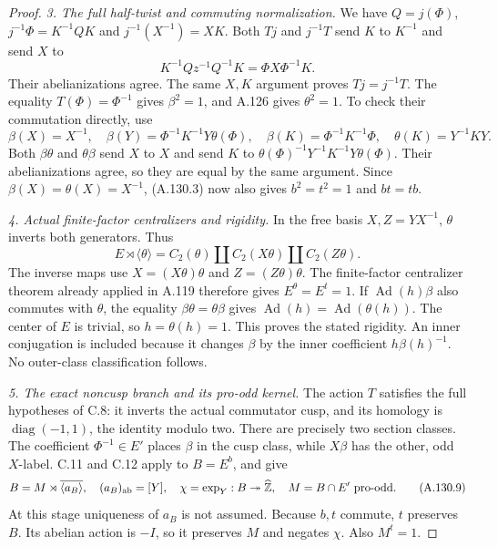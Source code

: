 \begin{proof}
\emph{3. The full half-twist and commuting normalization.}
We have \(Q=j(\Phi)\), \(j^{-1}\Phi=K^{-1}QK\) and
\(j^{-1}(X^{-1})=XK\). Both \(Tj\) and \(j^{-1}T\)
send \(K\) to \(K^{-1}\) and send \(X\) to
\[
          K^{-1}Qz^{-1}Q^{-1}K=\Phi X\Phi^{-1}K .
\]
Their abelianizations agree. The same \(X,K\) argument proves
\(Tj=j^{-1}T\). The equality \(T(\Phi)=\Phi^{-1}\) gives
\(\beta^2=1\), and A.126 gives \(\theta^2=1\).
To check their commutation directly, use
\[
 \beta(X)=X^{-1},\quad
 \beta(Y)=\Phi^{-1}K^{-1}Y\theta(\Phi),\quad
 \beta(K)=\Phi^{-1}K^{-1}\Phi,\quad
 \theta(K)=Y^{-1}KY .
\]
Both \(\beta\theta\) and \(\theta\beta\) send \(X\) to \(X\)
and send \(K\) to
\(\theta(\Phi)^{-1}Y^{-1}K^{-1}Y\theta(\Phi)\).
Their abelianizations agree, so they are equal by the same
argument. Since \(\beta(X)=\theta(X)=X^{-1}\), (A.130.3)
now also gives \(b^2=t^2=1\) and \(bt=tb\).

\emph{4. Actual finite-factor centralizers and rigidity.}
In the free basis \(X,Z=YX^{-1}\), \(\theta\) inverts both
generators. Thus
\[
 E\rtimes\langle\theta\rangle
     =C_2(\theta)\amalg C_2(X\theta)\amalg C_2(Z\theta).
                                                               \tag{A.130.8}
\]
The inverse maps use \(X=(X\theta)\theta\) and
\(Z=(Z\theta)\theta\).
The finite-factor centralizer theorem already applied in A.119
\citep[Theorem~B']{A_HR1985} therefore gives
\(E^\theta=E^t=1\).
If \(\operatorname{Ad}(h)\beta\) also commutes with \(\theta\),
the equality \(\beta\theta=\theta\beta\) gives
\(\operatorname{Ad}(h)=\operatorname{Ad}(\theta(h))\).
The center of \(E\) is trivial, so \(h=\theta(h)=1\).
This proves the stated rigidity. An inner conjugation is included
because it changes \(\beta\) by the inner coefficient
\(h\beta(h)^{-1}\). No outer-class classification follows.

\emph{5. The exact noncusp branch and its pro-odd kernel.}
The action \(T\) satisfies the full hypotheses of C.8:
it inverts the actual commutator cusp, and its homology is
\(\operatorname{diag}(-1,1)\), the identity modulo two.
There are precisely two section classes. The coefficient
\(\Phi^{-1}\in E'\) places \(\beta\) in the cusp class,
while \(X\beta\) has the other, odd \(X\)-label.
C.11 and C.12 apply to \(B=E^b\), and give
\[
 B=M\rtimes\overline{\langle a_B\rangle},\quad
 (a_B)_{\rm ab}=[Y],\quad
 \chi=\exp_Y:B\twoheadrightarrow\widehat{\mathbb Z},\quad
 M=B\cap E'\text{ pro-odd}.                                 \tag{A.130.9}
\]
At this stage uniqueness of \(a_B\) is not assumed.
Because \(b,t\) commute, \(t\) preserves \(B\).
Its abelian action is \(-I\), so it preserves \(M\) and
negates \(\chi\). Also \(M^t=1\).


\end{proof}
